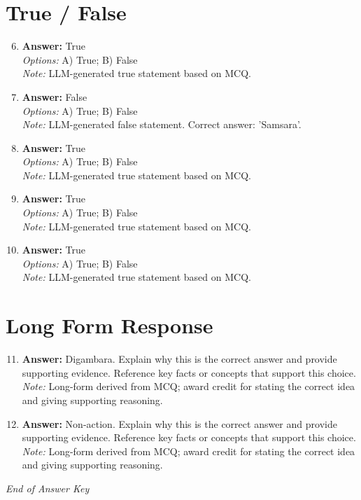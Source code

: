 \documentclass[12pt]{article}
\begin{document}
\section*{True / False}
\begin{enumerate}[label=\arabic*.]
\setcounter{enumi}{5}
\item \textbf{Answer:} True
\\ \textit{Options:} A) True; B) False
\\ \textit{Note:} LLM-generated true statement based on MCQ.
\item \textbf{Answer:} False
\\ \textit{Options:} A) True; B) False
\\ \textit{Note:} LLM-generated false statement. Correct answer: 'Samsara'.
\item \textbf{Answer:} True
\\ \textit{Options:} A) True; B) False
\\ \textit{Note:} LLM-generated true statement based on MCQ.
\item \textbf{Answer:} True
\\ \textit{Options:} A) True; B) False
\\ \textit{Note:} LLM-generated true statement based on MCQ.
\item \textbf{Answer:} True
\\ \textit{Options:} A) True; B) False
\\ \textit{Note:} LLM-generated true statement based on MCQ.
\end{enumerate}

\section*{Long Form Response}
\begin{enumerate}[label=\arabic*.]
\setcounter{enumi}{10}
\item \textbf{Answer:} Digambara. Explain why this is the correct answer and provide supporting evidence. Reference key facts or concepts that support this choice.
\\ \textit{Note:} Long-form derived from MCQ; award credit for stating the correct idea and giving supporting reasoning.
\item \textbf{Answer:} Non-action. Explain why this is the correct answer and provide supporting evidence. Reference key facts or concepts that support this choice.
\\ \textit{Note:} Long-form derived from MCQ; award credit for stating the correct idea and giving supporting reasoning.
\end{enumerate}

\vfill
\noindent\textit{End of Answer Key}
\end{document}
